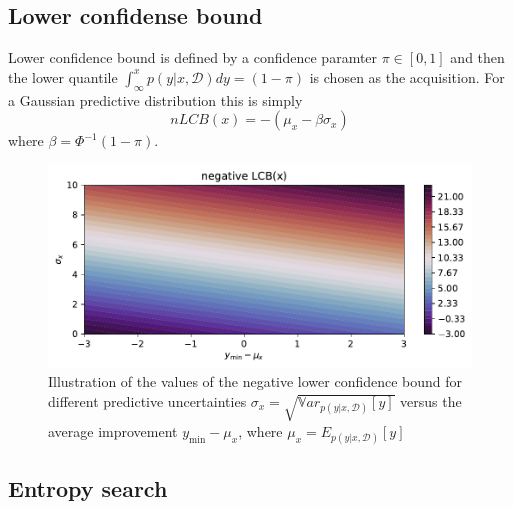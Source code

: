 \subsection{Lower confidense bound}
Lower confidence bound is defined by a confidence paramter $\pi \in [0,1]$
and then the lower quantile $\int_{\infty}^x p(y|x,\mathcal{D})dy = (1-\pi)$
is chosen as the acquisition. For a Gaussian predictive distribution this is 
simply 
$$nLCB(x) = - (\mu_x - \beta \sigma_x)$$
where $\beta = \Phi^{-1}(1-\pi)$.  
\begin{figure}%
    \centering
    \includegraphics[width=\textwidth]{Pictures/neg_lower_confidence_illustration.pdf}
    \caption{Illustration of the values of the negative lower confidence bound for different predictive
    uncertainties $\sigma_x = \sqrt{\mathbb{V}ar_{p(y|x,\mathcal{D})}[y]}$ versus the average
    improvement $y_{\min}-\mu_x$, where $\mu_x = E_{p(y|x,\mathcal{D})}[y]$}
    \label{nLCB_illustration}
\end{figure}

\subsection{Entropy search}




